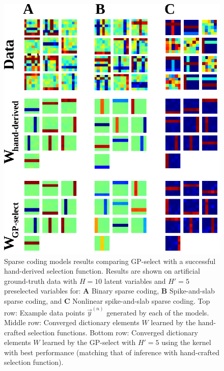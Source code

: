 \begin{figure}[h!]
\begin{center}
\includegraphics[width=.45\textwidth]{sparsecoding/bars-test.pdf}%
\caption{Sparse coding models results comparing GP-select with a successful hand-derived selection function.
Results are shown on artificial ground-truth data with $H=10$ latent variables and $H'=5$ preselected variables for: \textbf{A} Binary sparse coding, \textbf{B} Spike-and-slab sparse coding, and \textbf{C} Nonlinear spike-and-slab sparse coding.
Top row: Example data points $\vec{y}^{(n)}$ generated by each of the models.
Middle row: Converged dictionary elements $W$ learned by the hand-crafted selection functions.
Bottom row: Converged dictionary elements $W$ learned by the GP-select with $H'=5$ using the kernel with best performance (matching that of inference with hand-crafted selection function).
}\label{fig:sparse}
\end{center}
\end{figure}

